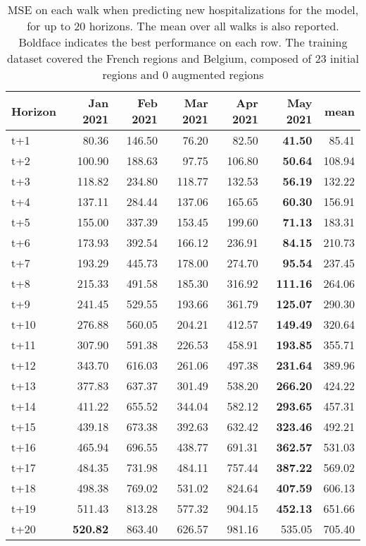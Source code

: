 \begin{table}[H]
\centering
\caption{MSE on each walk when predicting new hospitalizations for the model, for up to 20 horizons. The mean over all walks is also reported. Boldface indicates the best performance on each row. The training dataset covered the French regions and Belgium, composed of 23 initial regions and 0 augmented regions }
\label{tab:MSE_walk_assembly}
\begin{tabular}{lrrrrrr}
\toprule
Horizon &  Jan 2021 &  Feb 2021 &  Mar 2021 &  Apr 2021 &  May 2021 &   mean \\
\midrule
t+1  & 80.36  & 146.50  & 76.20  & 82.50  & \textbf{41.50}  & 85.41  \\
t+2  & 100.90  & 188.63  & 97.75  & 106.80  & \textbf{50.64}  & 108.94  \\
t+3  & 118.82  & 234.80  & 118.77  & 132.53  & \textbf{56.19}  & 132.22  \\
t+4  & 137.11  & 284.44  & 137.06  & 165.65  & \textbf{60.30}  & 156.91  \\
t+5  & 155.00  & 337.39  & 153.45  & 199.60  & \textbf{71.13}  & 183.31  \\
t+6  & 173.93  & 392.54  & 166.12  & 236.91  & \textbf{84.15}  & 210.73  \\
t+7  & 193.29  & 445.73  & 178.00  & 274.70  & \textbf{95.54}  & 237.45  \\
t+8  & 215.33  & 491.58  & 185.30  & 316.92  & \textbf{111.16}  & 264.06  \\
t+9  & 241.45  & 529.55  & 193.66  & 361.79  & \textbf{125.07}  & 290.30  \\
t+10  & 276.88  & 560.05  & 204.21  & 412.57  & \textbf{149.49}  & 320.64  \\
t+11  & 307.90  & 591.38  & 226.53  & 458.91  & \textbf{193.85}  & 355.71  \\
t+12  & 343.70  & 616.03  & 261.06  & 497.38  & \textbf{231.64}  & 389.96  \\
t+13  & 377.83  & 637.37  & 301.49  & 538.20  & \textbf{266.20}  & 424.22  \\
t+14  & 411.22  & 655.52  & 344.04  & 582.12  & \textbf{293.65}  & 457.31  \\
t+15  & 439.18  & 673.38  & 392.63  & 632.42  & \textbf{323.46}  & 492.21  \\
t+16  & 465.94  & 696.55  & 438.77  & 691.31  & \textbf{362.57}  & 531.03  \\
t+17  & 484.35  & 731.98  & 484.11  & 757.44  & \textbf{387.22}  & 569.02  \\
t+18  & 498.38  & 769.02  & 531.02  & 824.64  & \textbf{407.59}  & 606.13  \\
t+19  & 511.43  & 813.28  & 577.32  & 904.15  & \textbf{452.13}  & 651.66  \\
t+20  & \textbf{520.82}  & 863.40  & 626.57  & 981.16  & 535.05  & 705.40  \\

\bottomrule
\end{tabular}
\end{table}
